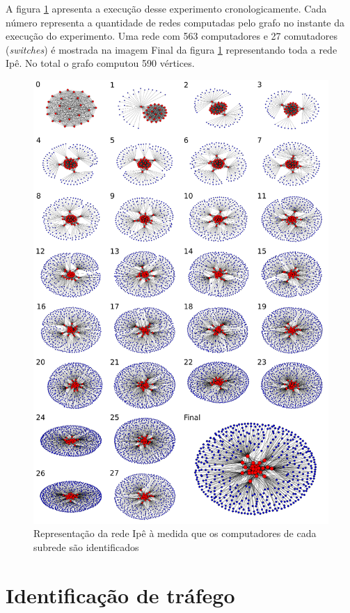A figura \ref{fig:full-graph-ipe} apresenta a execução desse experimento 
cronologicamente.
Cada número representa a quantidade de redes computadas pelo grafo no instante
da execução do experimento. 
Uma rede com 563 computadores e 27 comutadores (\emph{switches}) é mostrada
na imagem Final da figura \ref{fig:full-graph-ipe} representando toda a rede
Ipê.
No total o grafo computou 590 vértices.

\begin{figure}[htb!]
    \centering
    \label{fig:full-graph-ipe}
    \includegraphics[scale=0.395]{img/full-graph-ipe}
    \caption{Representação da rede Ipê à medida que os computadores de cada
    subrede são identificados}
\end{figure}


\section{Identificação de tráfego}

